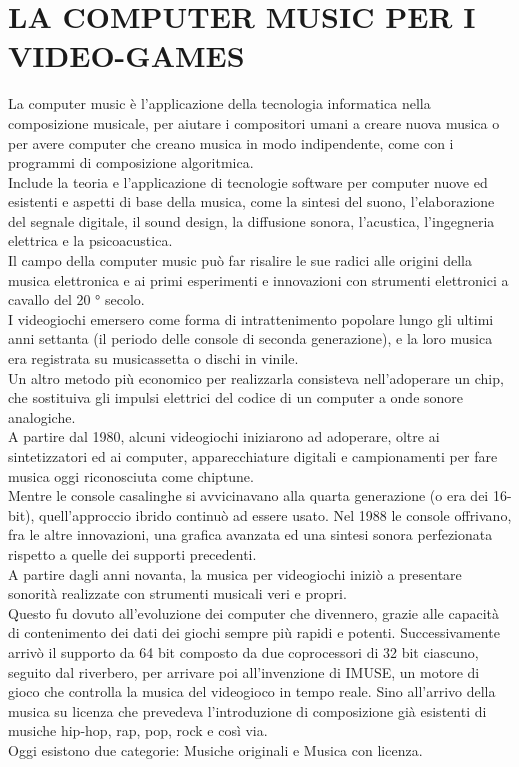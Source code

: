 
\chapter{LA COMPUTER MUSIC PER I VIDEO-GAMES}
\label{chp:La Computer Music per i Video-Games}
La computer music è l'applicazione della tecnologia informatica nella composizione musicale, per aiutare i compositori umani a creare nuova musica o per avere computer che creano musica in modo indipendente, come con i programmi di composizione algoritmica. \\
Include la teoria e l'applicazione di tecnologie software per computer nuove ed esistenti e aspetti di base della musica, come la sintesi del suono, l'elaborazione del segnale digitale, il sound design, la diffusione sonora, l'acustica, l'ingegneria elettrica e la psicoacustica.\\
Il campo della computer music può far risalire le sue radici alle origini della musica elettronica e ai primi esperimenti e innovazioni con strumenti elettronici a cavallo del 20 ° secolo.\\
I videogiochi emersero come forma di intrattenimento popolare lungo gli ultimi anni settanta (il periodo delle console di seconda generazione), e la loro musica era registrata su musicassetta o dischi in vinile.\\
Un altro metodo più economico per realizzarla consisteva nell'adoperare un chip, che sostituiva gli impulsi elettrici del codice di un computer a onde sonore analogiche.\\
A partire dal 1980, alcuni videogiochi iniziarono ad adoperare, oltre ai sintetizzatori ed ai computer, apparecchiature digitali e campionamenti per fare musica oggi riconosciuta come chiptune.\\
Mentre le console casalinghe si avvicinavano alla quarta generazione (o era dei 16-bit), quell'approccio ibrido continuò ad essere usato.
Nel 1988 le console offrivano, fra le altre innovazioni, una grafica avanzata ed una sintesi sonora perfezionata rispetto a quelle dei supporti precedenti.\\
 A partire dagli anni novanta, la musica per videogiochi iniziò a presentare sonorità realizzate con strumenti musicali veri e propri.\\
 Questo fu dovuto all'evoluzione dei computer che divennero, grazie alle capacità di contenimento dei dati dei giochi sempre più rapidi e potenti.
 Successivamente arrivò il supporto da 64 bit composto da due coprocessori di 32 bit ciascuno, seguito dal riverbero, per arrivare poi all'invenzione di IMUSE, un motore di gioco che controlla la musica del videogioco in tempo reale.
 Sino all'arrivo della musica su licenza che prevedeva l'introduzione di composizione già esistenti di musiche hip-hop, rap, pop, rock e così via.\\
 Oggi esistono due categorie: Musiche originali e Musica con licenza.


